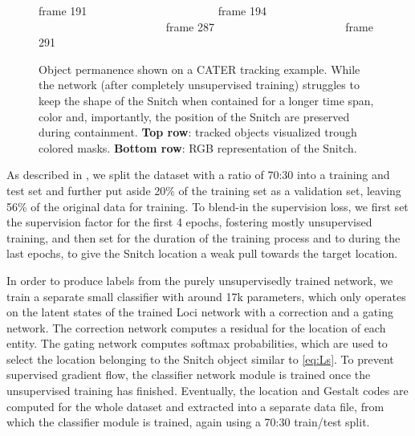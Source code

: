 \documentclass{article} \usepackage{iclr2023_conference_arxiv,times}
\def\imagepadding{0.2cm}
\def\imagepaddingy{0.15cm}
\begin{document}
\begin{figure}[t]
    
    frame 191 ~~~~~~~~~~~~~~~~~~~~~~
    frame 194 ~~~~~~~~~~~~~~~~~~~~~~
    frame 287 ~~~~~~~~~~~~~~~~~~~~~~
    frame 291
    
\vskip\imagepaddingy
    \begin{elasticrow}[\imagepadding]
    \end{elasticrow}
    \vskip\imagepaddingy
    \begin{elasticrow}[\imagepadding]
    \end{elasticrow}
    
    \caption{Object permanence shown on a CATER tracking example. While the network (after completely unsupervised training) struggles to keep the shape of the Snitch when contained for a longer time span, color and, importantly, the position of the Snitch are preserved during containment.  
    \textbf{Top row}: tracked objects visualized trough colored masks. \textbf{Bottom row}: RGB representation of the Snitch.} \label{fig:cater_object_permanence}
\end{figure}



As described in \citet{girdhar2019CATER}, we split the dataset with a ratio of 70:30 into a training and test set and further put aside 20\% of the training set as a validation set, leaving 56\% of the original data for training. 
To blend-in the supervision loss, we first set the supervision factor  for the first 4 epochs, fostering mostly unsupervised training, and then set  for the duration of the training process and to  during the last epochs, to give the Snitch location a weak pull towards the target location.

In order to produce labels from the purely unsupervisedly trained network, we train a separate small classifier with around 17k parameters, which only operates on the latent states of the trained Loci network with a correction and a gating network. The correction network computes a residual for the location of each entity. The gating network computes softmax probabilities, which are used to select the location belonging to the Snitch object similar to \autoref{eq:Ls}. To prevent supervised gradient flow, the classifier network module is trained once the unsupervised training has finished. Eventually, the location and Gestalt codes are computed for the whole dataset and extracted into a separate data file, from which the classifier module is trained, again using a 70:30 train/test split.
\end{document}
